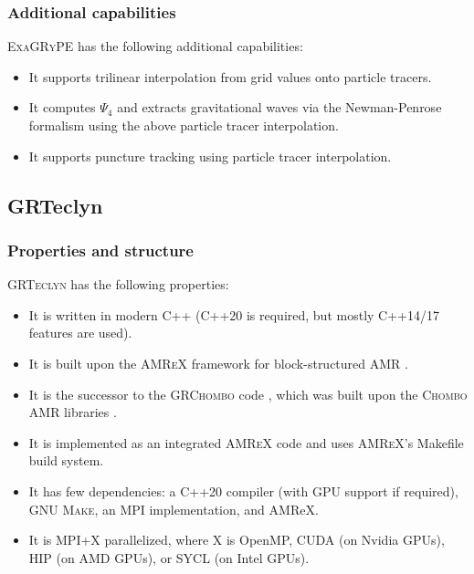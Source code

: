 \documentclass[12pt,a4paper]{article}
\numberwithin{figure}{subsection}
\newcommand{\exagrype}{\textsc{ExaGRyPE}\xspace}
\newcommand{\grteclyn}{\textsc{GRTeclyn}\xspace}
\newcommand{\amrex}{\textsc{AMReX}\xspace}
\begin{document}
\subsubsection{Additional capabilities}
\exagrype has the following additional capabilities:
\begin{itemize}
    \item It supports trilinear interpolation from grid values onto particle
    tracers.
    \item It computes $\Psi_4$ and extracts gravitational waves via the
    Newman-Penrose formalism using the above particle tracer interpolation.
    \item It supports puncture tracking using particle tracer interpolation.
\end{itemize}

\subsection{GRTeclyn}

\subsubsection{Properties and structure}
\grteclyn has the following properties:
\begin{itemize}
    \item It is written in modern C++ (C++20 is required, but mostly C++14/17
    features are used).
    \item It is built upon the \amrex framework for block-structured AMR
    \cite{Zhang:2019a, Zhang:2021a}.
    \item It is the successor to the \textsc{GRChombo} code
    \cite{Clough:2015sqa,Andrade:2021rbd}, which was built upon the
    \textsc{Chombo} AMR libraries \cite{Adams:2019a}.
    \item It is implemented as an integrated \amrex code and uses \amrex's
    Makefile build system.
    \item It has few dependencies: a C++20 compiler (with GPU support if
    required), \textsc{GNU Make}, an MPI implementation, and AMReX.
    \item It is MPI+X parallelized, where X is OpenMP, CUDA (on Nvidia GPUs),
    HIP (on AMD GPUs), or SYCL (on Intel GPUs).
\end{itemize}
\end{document}

